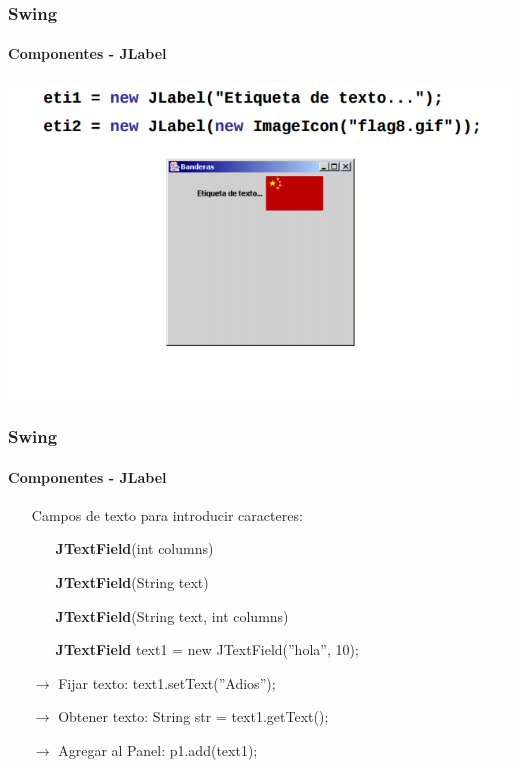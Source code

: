 \documentclass{beamer}
\begin{document}
    \begin{frame}
		\frametitle{Swing}
		\framesubtitle{Componentes - JLabel}

        \begin{center}
	        	\includegraphics[scale=.45]{images/ejemplo-jlabel.png}
	    \end{center}
	\end{frame}

    \begin{frame}
		\frametitle{Swing}
		\framesubtitle{Componentes - JLabel}

        \begin{itemize}
		    \item[\checkmark] Campos de texto para introducir caracteres:
		    \begin{itemize}
        		    \item[] \textbf{JTextField}(int columns)
        		    \item[] \textbf{JTextField}(String text)
        		    \item[] \textbf{JTextField}(String text, int columns)
        		    \item[] \textbf{JTextField} text1 = new JTextField(''hola'', 10);
	    	    \end{itemize}
	    	    \item[$\rightarrow$] Fijar texto: text1.setText(''Adios'');
	    	    \item[$\rightarrow$] Obtener texto: String str = text1.getText();
	    	    \item[$\rightarrow$] Agregar al Panel: p1.add(text1);
		\end{itemize}
	\end{frame}
\end{document}
